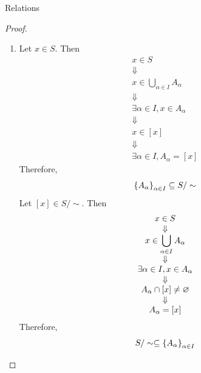 \begin{section}{Relations}
\begin{proof}
\begin{enumerate}[label=\textbf{(\Alph*)}]
\begin{itemize}
\[\begin{array}{c}
            x \in A_{\alpha} \land z \in A_{\alpha} \\
            \Downarrow \\
            x \sim z
            \end{array}
            \]
        \end{itemize}
        \item Let $x \in S$. Then
        \[
        \begin{array}{c}
            x \in S \\
            \Downarrow \\
            x \in \displaystyle \bigcup_{\alpha \in I} A_{\alpha} \\
            \Downarrow \\
            \exists \alpha \in I, x \in A_{\alpha} \\
            \Downarrow \\
            x \in [x] \\
            \Downarrow \\
            \exists \alpha \in I, A_{\alpha} = [x]
        \end{array}
        \]
        Therefore,
        \[
        \set*{A_{\alpha}}_{\alpha \in I} \subseteq S / \sim
        \]
        Let $[x] \in S / \sim$. Then
        \[
        \begin{array}{c}
            x \in S \\
            \Downarrow \\
            x \in \displaystyle \bigcup_{\alpha \in I} A_{\alpha} \\
            \Downarrow \\
            \exists \alpha \in I, x \in A_{\alpha} \\
            \Downarrow \\
            A_{\alpha} \cap [x] \neq \vnot \\
            \Downarrow \\
            A_{\alpha} = [x]
        \end{array}
        \]
        Therefore,
        \[
        S / \sim \subseteq \set*{A_{\alpha}}_{\alpha \in I}
        \]
    \end{enumerate}
\end{proof}

\end{section}